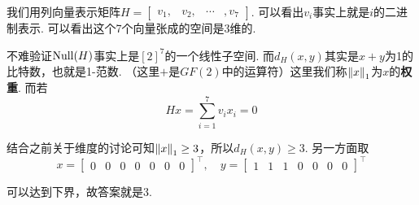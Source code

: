我们用列向量表示矩阵$H = \begin{bmatrix}
    v_1, & v_2, & \cdots & ,v_7
\end{bmatrix}$. 可以看出$v_i$事实上就是$i$的二进制表示. 可以看出这个7个向量张成的空间是3维的. 

不难验证$\operatorname*{Null}(H)$事实上是$[2]^7$的一个线性子空间. 而$d_H(x, y)$其实是$x + y$为1的比特数，也就是1-范数. （这里$+$是$GF(2)$中的运算符）这里我们称$\left\lVert x\right\rVert_1$为$x$的\textbf{权重}. 而若
\[
Hx = \sum_{i=1}^7 v_i x_i = 0
\]

结合之前关于维度的讨论可知$\left\lVert x\right\rVert_1 \ge 3$，所以$d_H(x,y) \ge 3$. 另一方面取
\[
x = \begin{bmatrix}
    0 & 0 & 0 & 0 & 0 & 0 & 0
\end{bmatrix}^\top, \quad 
y = \begin{bmatrix}
    1 & 1 & 1 & 0 & 0 & 0 & 0
\end{bmatrix}^\top
\]

可以达到下界，故答案就是$3$. 

